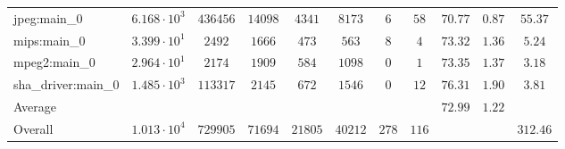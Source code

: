 \begin{tabular}{|l|c|c|c|c|c|c|c|c|c|c|}
jpeg:main\_0            & $ 6.168 \cdot 10^{3} $ & $ 436456 $ & $ 14098 $ & $ 4341  $ & $ 8173  $ & $ 6   $ & $ 58  $ & $ 70.77       $ & $ 0.87    $ & $ 55.37   $ \\
mips:main\_0            & $ 3.399 \cdot 10^{1} $ & $ 2492   $ & $ 1666  $ & $ 473   $ & $ 563   $ & $ 8   $ & $ 4   $ & $ 73.32       $ & $ 1.36    $ & $ 5.24    $ \\
mpeg2:main\_0           & $ 2.964 \cdot 10^{1} $ & $ 2174   $ & $ 1909  $ & $ 584   $ & $ 1098  $ & $ 0   $ & $ 1   $ & $ 73.35       $ & $ 1.37    $ & $ 3.18    $ \\
sha\_driver:main\_0     & $ 1.485 \cdot 10^{3} $ & $ 113317 $ & $ 2145  $ & $ 672   $ & $ 1546  $ & $ 0   $ & $ 12  $ & $ 76.31       $ & $ 1.90    $ & $ 3.81    $ \\
\hline
Average                 & $                    $ & $        $ & $       $ & $       $ & $       $ & $     $ & $     $ & $ 72.99       $ & $ 1.22    $ & $         $ \\
\hline
Overall                 & $ 1.013 \cdot 10^{4} $ & $ 729905 $ & $ 71694 $ & $ 21805 $ & $ 40212 $ & $ 278 $ & $ 116 $ & $             $ & $         $ & $ 312.46  $ \\
\hline
\end{tabular}
